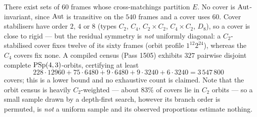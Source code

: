 \begin{proposition}\label{prop:crosscover}
There exist sets of $60$ frames whose cross-matchings partition $E$. No cover is
$\mathrm{Aut}$-invariant, since $\mathrm{Aut}$ is transitive on the $540$ frames and a cover uses
$60$. Cover stabilisers have order $2$, $4$ or $8$ (types $C_2$, $C_4$,
$C_2\times C_2$, $C_4\times C_2$, $D_8$), so a cover is close to rigid --- but the
residual symmetry is \emph{not} uniformly diagonal: a $C_2$-stabilised cover fixes
twelve of its sixty frames (orbit profile $1^{12}2^{24}$), whereas the $C_4$
covers fix none. A compiled census (Pass 1505) exhibits $327$ pairwise disjoint
complete $\mathrm{PSp}(4,3)$-orbits, certifying at least
\[
  228\cdot 12960+75\cdot 6480+9\cdot 6480+9\cdot 3240+6\cdot 3240=3\,547\,800
\]
covers; this is a lower bound and no exhaustive count is claimed. Note that the
orbit census is heavily $C_2$-weighted --- about $83\%$ of covers lie in $C_2$
orbits --- so a small sample drawn by a depth-first search, however its branch
order is permuted, is \emph{not} a uniform sample and its observed proportions
estimate nothing.
\end{proposition}
